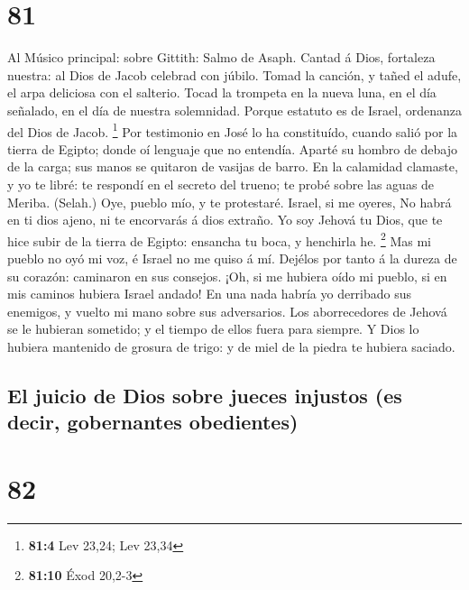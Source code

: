 \hypertarget{section-80}{%
\section{81}\label{section-80}}

 Al Músico principal: sobre Gittith: Salmo de Asaph. Cantad
á Dios, fortaleza nuestra: al Dios de Jacob celebrad con júbilo.
 Tomad la canción, y tañed el adufe, el arpa deliciosa con
el salterio.  Tocad la trompeta en la nueva luna, en el día
señalado, en el día de nuestra solemnidad.  Porque estatuto
es de Israel, ordenanza del Dios de Jacob. \footnote{\textbf{81:4} Lev
  23,24; Lev 23,34}  Por testimonio en José lo ha
constituído, cuando salió por la tierra de Egipto; donde oí lenguaje que
no entendía.  Aparté su hombro de debajo de la carga; sus
manos se quitaron de vasijas de barro.  En la calamidad
clamaste, y yo te libré: te respondí en el secreto del trueno; te probé
sobre las aguas de Meriba. (Selah.)  Oye, pueblo mío, y te
protestaré. Israel, si me oyeres,  No habrá en ti dios
ajeno, ni te encorvarás á dios extraño.  Yo soy Jehová tu
Dios, que te hice subir de la tierra de Egipto: ensancha tu boca, y
henchirla he. \footnote{\textbf{81:10} Éxod 20,2-3}  Mas mi
pueblo no oyó mi voz, é Israel no me quiso á mí.  Dejélos
por tanto á la dureza de su corazón: caminaron en sus consejos.
 ¡Oh, si me hubiera oído mi pueblo, si en mis caminos
hubiera Israel andado!  En una nada habría yo derribado sus
enemigos, y vuelto mi mano sobre sus adversarios.  Los
aborrecedores de Jehová se le hubieran sometido; y el tiempo de ellos
fuera para siempre.  Y Dios lo hubiera mantenido de grosura
de trigo: y de miel de la piedra te hubiera saciado.

\hypertarget{el-juicio-de-dios-sobre-jueces-injustos-es-decir-gobernantes-obedientes}{%
\subsection{El juicio de Dios sobre jueces injustos (es decir,
gobernantes
obedientes)}\label{el-juicio-de-dios-sobre-jueces-injustos-es-decir-gobernantes-obedientes}}

\hypertarget{section-81}{%
\section{82}\label{section-81}}

